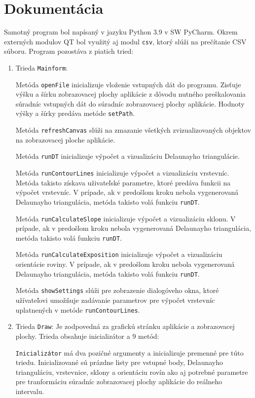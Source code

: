 \documentclass[11pt]{article}
\begin{document}
\newpage
\section{Dokumentácia}
Samotný program bol napísaný v jazyku Python 3.9 v SW PyCharm. Okrem externých modulov QT bol využitý aj modul \texttt{csv}, ktorý slúži na prečítanie CSV súboru. Program pozostáva z piatich tried:
\begin{enumerate}
    \item Trieda \texttt{Mainform}: 
    
    Metóda \texttt{openFile} inicializuje vloženie vstupných dát do programu. Zisťuje výšku a šírku zobrazovacej plochy aplikácie z dôvodu nutného preškalovania súradníc vstupných dát do súradníc zobrazovacej plochy aplikácie. Hodnoty výšky a šírky predáva metóde \texttt{setPath}.
    
    Metóda \texttt{refreshCanvas} slúži na zmazanie všetkých zvizualizovaných objektov na zobrazovacej ploche aplikácie. 
    
    Metóda \texttt{runDT} inicializuje výpočet a vizualizáciu Delaunayho triangulácie. 
    
    Metóda \texttt{runContourLines} inicializuje výpočet a vizualizáciu vrstevníc. Metóda takisto získava uživateľské parametre, ktoré predáva funkcii na výpočet vrstevníc. V prípade, ak v predošlom kroku nebola vygenerovaná Delaunayho triangulácia, metóda takisto volá funkciu \texttt{runDT}. 
    
    Metóda \texttt{runCalculateSlope} inicializuje výpočet a vizualizáciu sklonu. V prípade, ak v predošlom kroku nebola vygenerovaná Delaunayho triangulácia, metóda takisto volá funkciu \texttt{runDT}.
    
    Metóda \texttt{runCalculateExposition} inicializuje výpočet a vizualizáciu orientácie roviny. V prípade, ak v predošlom kroku nebola vygenerovaná Delaunayho triangulácia, metóda takisto volá funkciu \texttt{runDT}.
    
    Metóda \texttt{showSettings} slúži pre zobrazenie dialogóveho okna, ktoré užívateľovi umožňuje zadávanie parametrov pre výpočet vrstevníc uplatnených v metóde \texttt{runContourLines}.
    
    \item Trieda \texttt{Draw}:
    Je zodpovedná za grafickú stránku aplikácie a zobrazovacej plochy. Trieda obsahuje inicializátor a 9 metód: 
    
    \texttt{Inicializátor} má dva pozičné argumenty a inicializuje premenné pre túto triedu. Inicializované sú prázdne listy pre vstupné body, Delaunayho trianguláciu, vrstevnice, sklony a orientáciu rovín ako aj potrebné parametre pre tranformáciu súradníc zobrazovacej plochy aplikácie do reálneho intervalu. 
    

\end{enumerate}
\end{document}
